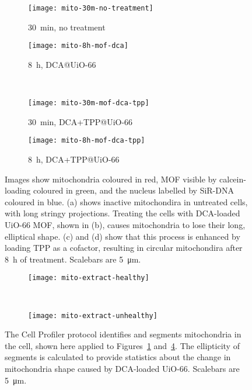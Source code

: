\begin{figure}[p]
\centering
	\begin{subfigure}[b]{0.49\textwidth}
	\texttt{[image: mito-30m-no-treatment]}
	\caption{\SI{30}{\minute}, no treatment} \label{fig:mito-30m-no-treatment}
	\end{subfigure}
	\hfill
	\begin{subfigure}[b]{0.49\textwidth}
	\texttt{[image: mito-8h-mof-dca]}
	\caption{\SI{8}{\hour}, DCA@UiO-66} \label{fig:mito-8h-mof-dca}
	\end{subfigure}
	
	~\newline
		\begin{subfigure}[b]{0.49\textwidth}
	\texttt{[image: mito-30m-mof-dca-tpp]}
	\caption{\SI{30}{\minute}, DCA+TPP@UiO-66}\label{fig:mito-30m-mof-dca-tpp}
	\end{subfigure}
	\hfill
	\begin{subfigure}[b]{0.49\textwidth}
	\texttt{[image: mito-8h-mof-dca-tpp]}
	\caption{\SI{8}{\hour}, DCA+TPP@UiO-66}\label{fig:mito-8h-mof-dca-tpp}
	\end{subfigure}
\caption[MOFs: UiO-66 MOF loaded with DCA changes mitochondria's shape]{Images show mitochondria coloured in red, MOF visible by calcein-loading coloured in green, and the nucleus labelled by SiR-DNA coloured in blue. (a) shows inactive mitochondira in untreated cells, with long stringy projections. Treating the cells with DCA-loaded UiO-66 MOF, shown in (b), causes mitochondria to lose their long, elliptical shape. (c) and (d) show that this process is enhanced by loading TPP as a cofactor, resulting in circular mitochondira after \SI{8}{\hour} of treatment. Scalebars are \SI{5}{\micro\metre}. }
\label{fig:mito-SIM-images}
\end{figure}
\begin{figure}[p]
\centering
	\begin{subfigure}[b]{0.49\textwidth}

\texttt{[image: mito-extract-healthy]}
	\caption{}
	\end{subfigure} ~
	\begin{subfigure}[b]{0.49\textwidth}
	\texttt{[image: mito-extract-unhealthy]}
	\caption{}
	\end{subfigure}
\caption[MOFs: Mitochondria segmentation in Cell Profiler allow statistical shape analysis]{The Cell Profiler\cite{carpenter2006cellprofiler} protocol identifies and segments mitochondria in the cell, shown here applied to Figures~\ref{fig:mito-30m-no-treatment} and~\ref{fig:mito-8h-mof-dca-tpp}. The ellipticity of segments is calculated to provide statistics about the change in mitochondria shape caused by DCA-loaded UiO-66. Scalebars are \SI{5}{\micro\metre}. }
\label{fig:cell-profiler-segmentation}
\end{figure}

